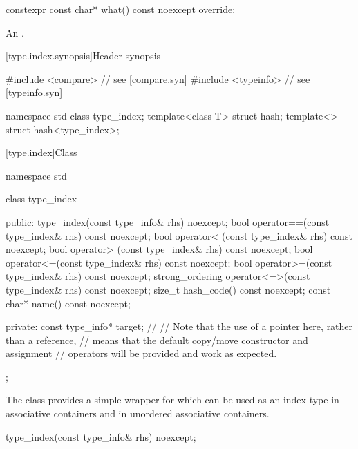 %
\begin{itemdecl}
constexpr const char* what() const noexcept override;
\end{itemdecl}

\begin{itemdescr}
\pnum
\returns
An  \ntbs{}.
\end{itemdescr}

[type.index.synopsis]{Header  synopsis}

%
\begin{codeblock}
#include <compare>              // see \ref{compare.syn}
#include <typeinfo>             // see \ref{typeinfo.syn}

namespace std {
  class type_index;
  template<class T> struct hash;
  template<> struct hash<type_index>;
}
\end{codeblock}

[type.index]{Class }

%
\begin{codeblock}
namespace std {
  class type_index {
  public:
    type_index(const type_info& rhs) noexcept;
    bool operator==(const type_index& rhs) const noexcept;
    bool operator< (const type_index& rhs) const noexcept;
    bool operator> (const type_index& rhs) const noexcept;
    bool operator<=(const type_index& rhs) const noexcept;
    bool operator>=(const type_index& rhs) const noexcept;
    strong_ordering operator<=>(const type_index& rhs) const noexcept;
    size_t hash_code() const noexcept;
    const char* name() const noexcept;

  private:
    const type_info* target;    // \expos
    // Note that the use of a pointer here, rather than a reference,
    // means that the default copy/move constructor and assignment
    // operators will be provided and work as expected.
  };
}
\end{codeblock}

\pnum
The class  provides a simple wrapper for
 which can be used as an index type in associative
containers and in unordered associative
containers.

%
\begin{itemdecl}
type_index(const type_info& rhs) noexcept;
\end{itemdecl}


